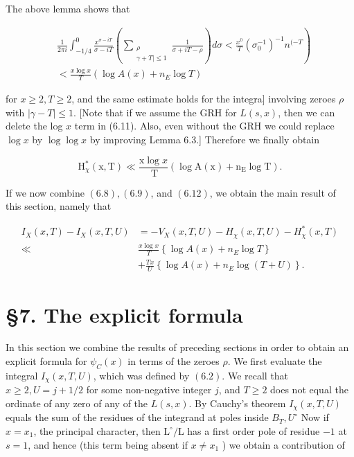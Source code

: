 The above lemma shows that

$$
\begin{aligned}
& \left.\frac{1}{2 \pi i} \int_{-1 / 4}^{0} \frac{x^{\sigma-i T}}{\sigma-i T}\left(\sum_{\substack{\rho \\ \gamma+T \mid \leqslant 1}} \frac{1}{\sigma+i T-\rho}\right) d \sigma<\frac{x^{0}}{T}\left(\sigma_{0}^{-1}\right)^{-1} n^{(-T}\right) \\
& <\frac{x \log x}{T}\left(\log A(x)+n_{E} \log T\right)
\end{aligned}
$$

for $x \geqslant 2, T \geqslant 2$, and the same estimate holds for the integra] involving zeroes $\rho$ with $|\gamma-T| \leqslant 1$. [Note that if we assume the GRH for $L(s, x)$, then we can delete the log $x$ term in (6.11). Also, even without the GRH we could replace $\log x$ by $\log \log x$ by improving Lemma 6.3.] Therefore we finally obtain

$$
\mathrm{H}_{\chi}^{*}(\mathrm{x}, \mathrm{T}) \ll \frac{\mathrm{x} \log x}{\mathrm{~T}}\left(\log \mathrm{A}(\mathrm{x})+\mathrm{n}_{\mathrm{E}} \log \mathrm{T}\right) .
$$

If we now combine $(6.8),(6.9)$, and $(6.12)$, we obtain the main result of this section, namely that

$$
\begin{aligned}
I_{X}(x, T)-I_{X}(x, T, U) &=-V_{X}(x, T, U)-H_{\chi}(x, T, U)-H_{\chi}^{*}(x, T) \\
\ll & \frac{x \log x}{T}\left\{\log A(x)+n_{E} \log T\right\} \\
&+\frac{T x}{U}\left\{\log A(x)+n_{E} \log (T+U)\right\} .
\end{aligned}
$$

\section{§7. The explicit formula}

In this section we combine the results of preceding sections in order to obtain an explicit formula for $\psi_{C}(x)$ in terms of the zeroes $\rho$. We first evaluate the integral $I_{\chi}(x, T, U)$, which was defined by $(6.2)$. We recall that $x \geqslant 2, U=j+1 / 2$ for some non-negative integer $j$, and $T \geqslant 2$ does not equal the ordinate of any zero of any of the $L(s, x)$. By Cauchy's theorem $I_{\chi}(x, T, U)$ equals the sum of the residues of the integrand at poles inside $B_{T}, U^{\circ}$ Now if $x=x_{1}$, the principal character, then $\mathrm{L}^{\circ} / \mathrm{L}$ has a first order pole of residue $-1$ at $s=1$, and hence (this term being absent if $x \neq x_{1}$ ) we obtain a contribution of

